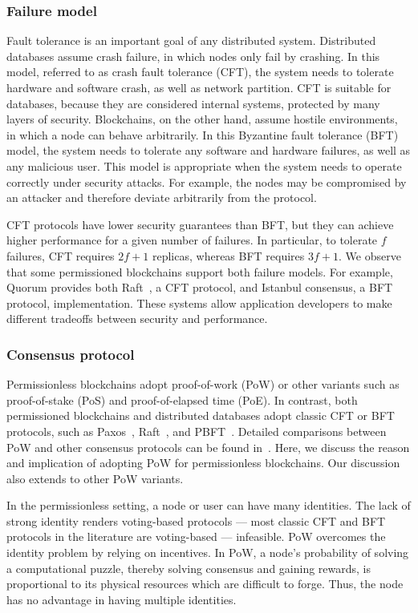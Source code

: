 \subsubsection{Failure model}
Fault tolerance is an important goal of any distributed system. Distributed databases assume crash failure, in
which nodes only fail by crashing. In this model, referred to as crash fault tolerance (CFT), the system needs
to tolerate hardware and software crash, as well as network partition. CFT is suitable for databases, because
they are considered internal systems, protected by many layers of security. Blockchains, on the
other hand, assume hostile environments, in which a node can behave arbitrarily. In this Byzantine fault tolerance (BFT) model, the system needs to tolerate any software and hardware failures, as well as any malicious user. This model is appropriate when the system needs to operate correctly under security attacks. For example, the nodes may be compromised by an attacker and therefore deviate arbitrarily from the protocol. 

CFT protocols have lower security guarantees than BFT, but they can achieve higher performance for
a given number of failures. In particular, to tolerate $f$ failures, CFT requires $2f+1$ replicas, whereas BFT
requires $3f+1$. We observe that some permissioned blockchains support both failure models. For example,
Quorum provides both Raft~\cite{raft}, a CFT protocol, and Istanbul consensus, a BFT protocol,
implementation. These systems allow application developers to make different tradeoffs between security and performance. 


\subsubsection{Consensus protocol}
Permissionless blockchains adopt proof-of-work (PoW) or other variants such as proof-of-stake (PoS) and proof-of-elapsed time (PoE). In contrast, both permissioned blockchains and distributed databases adopt classic CFT or BFT protocols, such as Paxos~\cite{lamport2001paxos, lamport2006fast}, Raft~\cite{raft}, and PBFT~\cite{castro1999practical}. Detailed comparisons between PoW and other consensus protocols can be found in~\cite{dinh2018untangling,consensus_survey}. Here, we discuss the reason and implication of adopting PoW for permissionless blockchains. Our discussion also extends to other PoW variants.    

In the permissionless setting, a node or user can have many identities. The lack of strong identity
renders voting-based protocols --- most classic CFT and BFT protocols in the literature are voting-based ---
infeasible. PoW overcomes the identity problem by relying on incentives. In PoW, a node's probability of
solving a computational puzzle, thereby solving consensus and gaining rewards, is proportional to its
physical resources which are difficult to forge. Thus, the node has no advantage in having multiple
identities. 

